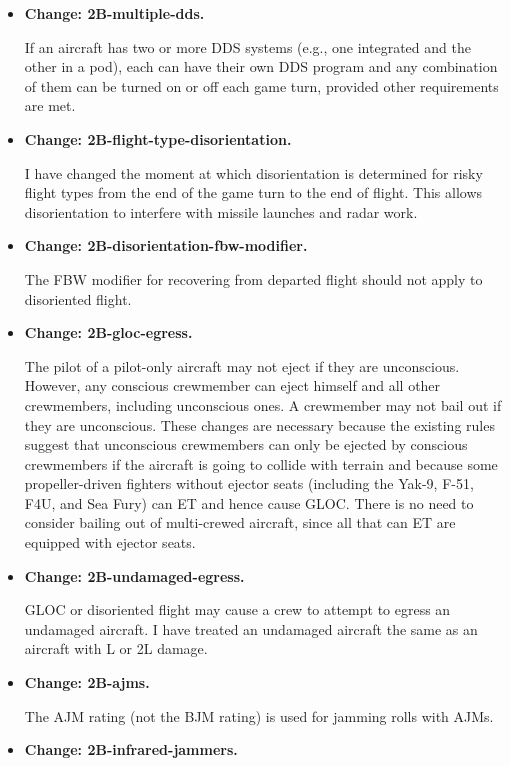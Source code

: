 \documentclass{report}
\newcommand{\changetag}[1]{\textbf{Change: #1.}\par}
\begin{document}
\begin{itemize}
    \item\changetag{2B-multiple-dds}

        If an aircraft has two or more DDS systems (e.g., one integrated and the other in a pod), each can have their own DDS program and any combination of them can be turned on or off each game turn, provided other requirements are met.

    \item\changetag{2B-flight-type-disorientation}

        I have changed the moment at which disorientation is determined for risky flight types from the end of the game turn to the end of flight. This allows disorientation to interfere with missile launches and radar work.

    \item\changetag{2B-disorientation-fbw-modifier}

        The FBW modifier for recovering from departed flight should not apply to disoriented flight.

    \item\changetag{2B-gloc-egress}

        The pilot of a pilot-only aircraft may not eject if they are unconscious. However, any conscious crewmember can eject himself and all other crewmembers, including unconscious ones. A crewmember may not bail out if they are unconscious. These changes are necessary because the existing rules suggest that unconscious crewmembers can only be ejected by conscious crewmembers if the aircraft is going to collide with terrain and because some propeller-driven fighters without ejector seats (including the Yak-9, F-51, F4U, and Sea Fury) can ET and hence cause GLOC. There is no need to consider bailing out of multi-crewed aircraft, since all that can ET are equipped with ejector seats.

    \item\changetag{2B-undamaged-egress}

        GLOC or disoriented flight may cause a crew to attempt to egress an undamaged aircraft. I have treated an undamaged aircraft the same as an aircraft with L or 2L damage.

    \item\changetag{2B-ajms}

        The AJM rating (not the BJM rating) is used for jamming rolls with AJMs.

    \item\changetag{2B-infrared-jammers}


\end{itemize}
\end{document}
